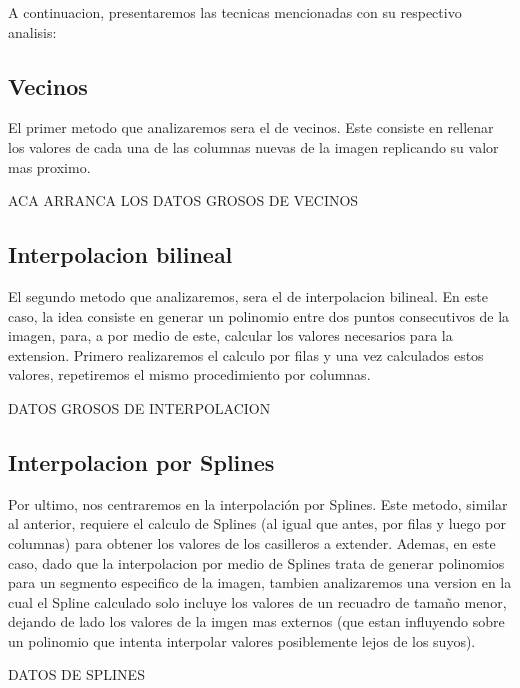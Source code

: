 A continuacion, presentaremos las tecnicas mencionadas con su respectivo analisis:

\subsection{Vecinos}
El primer metodo que analizaremos sera el de vecinos. Este consiste en rellenar los valores de cada una de las columnas nuevas de la imagen replicando su valor mas proximo.


ACA ARRANCA LOS DATOS GROSOS DE VECINOS

\subsection{Interpolacion bilineal}
El segundo metodo que analizaremos, sera el de interpolacion bilineal. En este caso, la idea consiste en generar un polinomio entre dos puntos consecutivos de la imagen, para, a por medio de este, calcular los valores necesarios para la extension. Primero realizaremos el calculo por filas y una vez calculados estos valores, repetiremos el mismo procedimiento por columnas.

DATOS GROSOS DE INTERPOLACION

\subsection{Interpolacion por Splines}
Por ultimo, nos centraremos en la interpolaci\'on por Splines. Este metodo, similar al anterior, requiere el calculo de Splines (al igual que antes, por filas y luego por columnas) para obtener los valores de los casilleros a extender. Ademas, en este caso, dado que la interpolacion por medio de Splines trata de generar polinomios para un segmento especifico de la imagen, tambien analizaremos una version en la cual el Spline calculado solo incluye los valores de un recuadro de tama\~no menor, dejando de lado los valores de la imgen mas externos (que estan influyendo sobre un polinomio que intenta interpolar valores posiblemente lejos de los suyos).

DATOS DE SPLINES